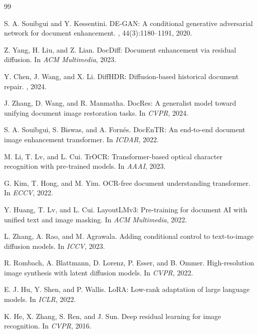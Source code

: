 \documentclass[conference]{IEEEtran}
\begin{document}
{\small

\begin{thebibliography}{99}

S. A. Souibgui and Y. Kessentini.
\newblock DE-GAN: A conditional generative adversarial network for document enhancement.
, 44(3):1180--1191, 2020.

Z. Yang, H. Liu, and Z. Lian.
\newblock DocDiff: Document enhancement via residual diffusion.
\newblock In {\em ACM Multimedia}, 2023.

Y. Chen, J. Wang, and X. Li.
\newblock DiffHDR: Diffusion-based historical document repair.
, 2024.

J. Zhang, D. Wang, and R. Manmatha.
\newblock DocRes: A generalist model toward unifying document image restoration tasks.
\newblock In {\em CVPR}, 2024.

S. A. Souibgui, S. Biswas, and A. Forn\'{e}s.
\newblock DocEnTR: An end-to-end document image enhancement transformer.
\newblock In {\em ICDAR}, 2022.

M. Li, T. Lv, and L. Cui.
\newblock TrOCR: Transformer-based optical character recognition with pre-trained models.
\newblock In {\em AAAI}, 2023.

G. Kim, T. Hong, and M. Yim.
\newblock OCR-free document understanding transformer.
\newblock In {\em ECCV}, 2022.

Y. Huang, T. Lv, and L. Cui.
\newblock LayoutLMv3: Pre-training for document AI with unified text and image masking.
\newblock In {\em ACM Multimedia}, 2022.

L. Zhang, A. Rao, and M. Agrawala.
\newblock Adding conditional control to text-to-image diffusion models.
\newblock In {\em ICCV}, 2023.

R. Rombach, A. Blattmann, D. Lorenz, P. Esser, and B. Ommer.
\newblock High-resolution image synthesis with latent diffusion models.
\newblock In {\em CVPR}, 2022.

E. J. Hu, Y. Shen, and P. Wallis.
\newblock LoRA: Low-rank adaptation of large language models.
\newblock In {\em ICLR}, 2022.

K. He, X. Zhang, S. Ren, and J. Sun.
\newblock Deep residual learning for image recognition.
\newblock In {\em CVPR}, 2016.


\end{thebibliography}}
\end{document}
